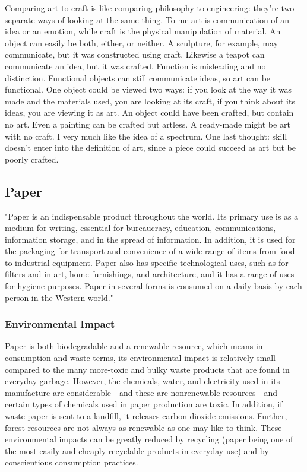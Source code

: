 Comparing art to craft is like comparing philosophy to engineering: they're two separate ways of looking at the same thing. To me art is communication of an idea or an emotion, while craft is the physical manipulation of material. An object can easily be both, either, or neither. A sculpture, for example, may communicate, but it was constructed using craft. Likewise a teapot can communicate an idea, but it was crafted. Function is misleading and no distinction. Functional objects can still communicate ideas, so art can be functional. One object could be viewed two ways: if you look at the way it was made and the materials used, you are looking at its craft, if you think about its ideas, you are viewing it as art. An object could have been crafted, but contain no art. Even a painting can be crafted but artless. A ready-made might be art with no craft. I very much like the idea of a spectrum. One last thought: skill doesn't enter into the definition of art, since a piece could succeed as art but be poorly crafted.

\subsection{Paper}
"Paper is an indispensable product throughout the world. Its primary use is as a medium for writing, essential for bureaucracy, education, communications, information storage, and in the spread of information. In addition, it is used for the packaging for transport and convenience of a wide range of items from food to industrial equipment. Paper also has specific technological uses, such as for filters and in art, home furnishings, and architecture, and it has a range of uses for hygiene purposes. Paper in several forms is consumed on a daily basis by each person in the Western world." \cite{trafford2012paper}

%
\subsubsection{Environmental Impact}
Paper is both biodegradable and a renewable resource, which means in consumption and waste terms, its environmental impact is relatively small compared to the many more-toxic and bulky waste products that are found in everyday garbage. However, the chemicals, water, and electricity used in its manufacture are considerable---and these are nonrenewable resources---and certain types of chemicals used in paper production are toxic. In addition, if waste paper is sent to a landfill, it releases carbon dioxide emissions. Further, forest resources are not always as renewable as one may like to think. These environmental impacts can be greatly reduced by recycling (paper being one of the most easily and cheaply recyclable products in everyday use) and by conscientious consumption practices.

